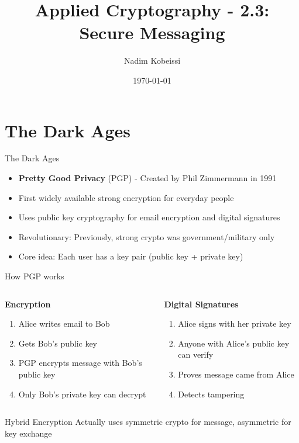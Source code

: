 \documentclass[aspectratio=169, lualatex, handout]{beamer}
\title{Applied Cryptography - 2.3: Secure Messaging}
\author{Nadim Kobeissi}
\institute{American University of Beirut}
\date{\today}
\begin{document}
\begin{frame}[plain]
	\titlepage
\end{frame}

\section{The Dark Ages}

\begin{frame}{The Dark Ages}
	\begin{itemize}
		\item \textbf{Pretty Good Privacy} (PGP) - Created by Phil Zimmermann in 1991
		\item First widely available strong encryption for everyday people
		\item Uses public key cryptography for email encryption and digital signatures
		\item Revolutionary: Previously, strong crypto was government/military only
		\item Core idea: Each user has a key pair (public key + private key)
	\end{itemize}
\end{frame}

\begin{frame}{How PGP works}
	\begin{columns}
		\begin{column}{0.5\textwidth}
			\textbf{Encryption}
			\begin{enumerate}
				\item Alice writes email to Bob
				\item Gets Bob's public key
				\item PGP encrypts message with Bob's public key
				\item Only Bob's private key can decrypt
			\end{enumerate}
		\end{column}
		\begin{column}{0.5\textwidth}
			\textbf{Digital Signatures}
			\begin{enumerate}
				\item Alice signs with her private key
				\item Anyone with Alice's public key can verify
				\item Proves message came from Alice
				\item Detects tampering
			\end{enumerate}
		\end{column}
	\end{columns}
	\begin{alertblock}{Hybrid Encryption}
		Actually uses symmetric crypto for message, asymmetric for key exchange
	\end{alertblock}
\end{frame}
\end{document}
